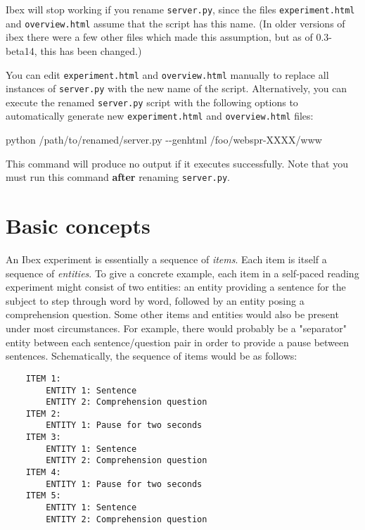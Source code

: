 \documentclass[
]{article}
\newenvironment{Shaded}{}{}
\newcommand{\ExtensionTok}[1]{#1}
\newcommand{\NormalTok}[1]{#1}
\begin{document}
Ibex will stop working if you rename \texttt{server.py}, since the files
\texttt{experiment.html} and \texttt{overview.html} assume that the
script has this name. (In older versions of ibex there were a few other
files which made this assumption, but as of 0.3-beta14, this has been
changed.)

You can edit \texttt{experiment.html} and \texttt{overview.html}
manually to replace all instances of \texttt{server.py} with the new
name of the script. Alternatively, you can execute the renamed
\texttt{server.py} script with the following options to automatically
generate new \texttt{experiment.html} and \texttt{overview.html} files:

\begin{Shaded}
\begin{Highlighting}[]
    \ExtensionTok{python}\NormalTok{ /path/to/renamed/server.py {-}{-}genhtml /foo/webspr{-}XXXX/www}
\end{Highlighting}
\end{Shaded}

This command will produce no output if it executes successfully. Note
that you must run this command \textbf{after} renaming
\texttt{server.py}.

\hypertarget{basic-concepts}{%
\section{Basic concepts}\label{basic-concepts}}

An Ibex experiment is essentially a sequence of \emph{items}. Each item
is itself a sequence of \emph{entities}. To give a concrete example,
each item in a self-paced reading experiment might consist of two
entities: an entity providing a sentence for the subject to step through
word by word, followed by an entity posing a comprehension question.
Some other items and entities would also be present under most
circumstances. For example, there would probably be a "separator" entity
between each sentence/question pair in order to provide a pause between
sentences. Schematically, the sequence of items would be as follows:

\begin{verbatim}
    ITEM 1:
        ENTITY 1: Sentence
        ENTITY 2: Comprehension question
    ITEM 2:
        ENTITY 1: Pause for two seconds
    ITEM 3:
        ENTITY 1: Sentence
        ENTITY 2: Comprehension question
    ITEM 4:
        ENTITY 1: Pause for two seconds
    ITEM 5:
        ENTITY 1: Sentence
        ENTITY 2: Comprehension question
\end{verbatim}
\end{document}

